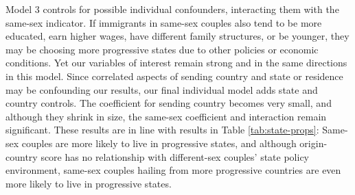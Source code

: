 \documentclass[
  11pt,
]{article}
\begin{document}
Model 3 controls for possible individual confounders, interacting them with the same-sex indicator. If immigrants in same-sex couples also tend to be more educated, earn higher wages, have different family structures, or be younger, they may be choosing more progressive states due to other policies or economic conditions. Yet our variables of interest remain strong and in the same directions in this model. Since correlated aspects of sending country and state or residence may be confounding our results, our final individual model adds state and country controls. The coefficient for sending country becomes very small, and although they shrink in size, the same-sex coefficient and interaction remain significant. These results are in line with results in Table \ref{tab:state-props}: Same-sex couples are more likely to live in progressive states, and although origin-country score has no relationship with different-sex couples' state policy environment, same-sex couples hailing from more progressive countries are even more likely to live in progressive states.
\end{document}
